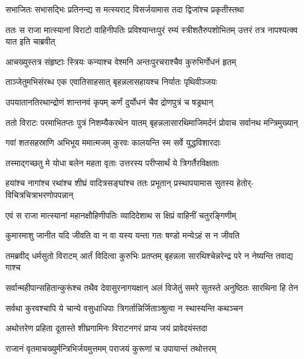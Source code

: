 \twolineshloka
{सभाजितः सभासद्भिः प्रतिनन्द्य स मत्स्यराट्}
{विसर्जयामास तदा द्विजांश्च प्रकृतीस्तथा}


\threelineshloka
{ततः स राजा मात्स्यानां विराटो वाहिनीपतिः}
{प्रविश्यान्तःपुरं रम्यं स्त्रीशतैरुपशोभितम्}
{उत्तरं तत्र नापश्यत्क्व यात इति चाब्रवीत्}


\twolineshloka
{आचख्युस्तत्र संहृष्टाः स्त्रियः कन्याश्च वेश्मनि}
{अन्तःपुरचराश्चैव कुरुभिर्गोधनं हृतम्}


\twolineshloka
{ताञ्जेतुमभिसंरब्ध एक एवातिसाहसात्}
{बृहन्नलासहायश्च निर्यातः पृथिवीञ्जयः}


\twolineshloka
{उपयातानतिरथान्द्रोणं शान्तनवं कृपम्}
{कर्णं दुर्योधनं चैव द्रोणपुत्रं च षड्रथान्}


\fourlineindentedshloka
{ततो विराटः परमाभितप्तः}
{पुत्रं निशम्यैकरथेन यातम्}
{बृहन्नलासारथिमाजिमर्दनं}
{प्रोवाच सर्वानथ मन्त्रिमुख्यान्}


\twolineshloka
{गवां शतसहस्राणि अभिभूय ममात्मजम्}
{कुरवः कालयन्ति स्म सर्वे युद्धविशारदाः}


\twolineshloka
{तस्माद्गच्छतु मे योधा बलेन महता वृताः}
{उत्तरस्य परीप्सार्थं ये त्रिगर्तैरविक्षताः}



\fourlineindentedshloka
{हयांश्च नागांश्च रथांश्च शीघ्रं}
{वादित्रसङ्घांश्च ततः प्रभूतान्}
{प्रस्थापयामास सुतस्य हेतोर्-}
{विचित्रचित्राभरणोपपन्नान्}


\twolineshloka
{एवं स राजा मात्स्यानां महानक्षौहिणीपतिः}
{व्यादिदेशाथ स क्षिप्रं वाहिनीं चतुरङ्गिणीम्}


\twolineshloka
{कुमारमाशु जानीत यदि जीवति वा न वा}
{यस्य यन्ता गतः षण्डो मन्येऽहं स न जीवति}


\fourlineindentedshloka
{तमब्रवीद् धर्मसुतो विराटम्}
{आर्तं विदित्वा कुरुभिः प्रतप्तम्}
{बृहन्नला सारथिश्चेन्नरेन्द्र}
{परे न नेष्यन्ति तवाद्य गाश्च}


\fourlineindentedshloka
{सर्वान्महीपान्सहितान्कुरूंश्च}
{तथैव देवासुरनागयक्षान्}
{अलं विजेतुं समरे सुतस्ते}
{अनुष्ठितः सारथिना हि तेन}


\twolineshloka
{सर्वथा कुरवश्चापि ये चान्ये वसुधाधिपाः}
{त्रिगर्तान्निर्जिताञ्श्रुत्वा न स्थास्यन्ति कथञ्चन}



\twolineshloka
{अथोत्तरेण प्रहिता दूतास्ते शीघ्रगामिनः}
{विराटनगरं प्राप्य जयं प्रावेदयंस्तदा}


\twolineshloka
{राजानं वृतमाचख्युर्मन्त्रिभिर्जयमुत्तमम्}
{पराजयं कुरूणां च उपायान्तं तथोत्तरम्}


